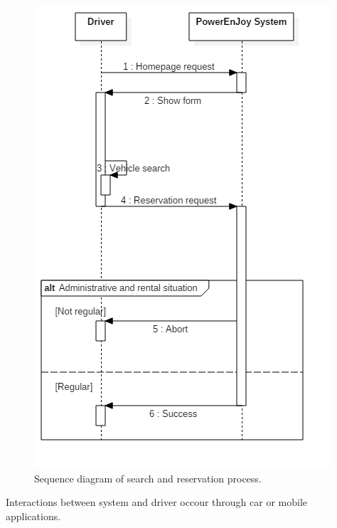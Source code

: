 \begin{figure}[H]
	\begin{center}
		\centering
		\includegraphics[height=0.9\textheight, keepaspectratio]{sequence_diagram/SearchReservation.png}
		\caption{Sequence diagram of search and reservation process.}
	\end{center}
\end{figure}


Interactions between system and driver occour through car or mobile applications.

